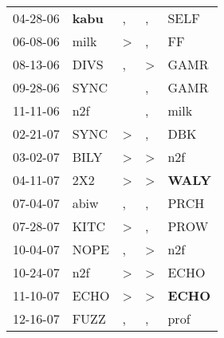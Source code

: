\begin{supertabular}{p{0.07\textwidth}p{0.06\textwidth}p{0.02\textwidth}p{0.02\textwidth}p{0.06\textwidth}}
          04-28-06\textsuperscript{} &  \textbf{kabu\textsuperscript{}} &                , &                , &           SELF\textsuperscript{} \\
          06-08-06\textsuperscript{} &           milk\textsuperscript{} &     \textgreater &                , &             FF\textsuperscript{} \\
          08-13-06\textsuperscript{} &           DIVS\textsuperscript{} &                , &     \textgreater &           GAMR\textsuperscript{} \\
          09-28-06\textsuperscript{} &           SYNC\textsuperscript{} &                  &                , &           GAMR\textsuperscript{} \\
          11-11-06\textsuperscript{} &            n2f\textsuperscript{} &                  &                , &           milk\textsuperscript{} \\
          02-21-07\textsuperscript{} &           SYNC\textsuperscript{} &     \textgreater &                , &            DBK\textsuperscript{} \\
          03-02-07\textsuperscript{} &           BILY\textsuperscript{} &     \textgreater &     \textgreater &            n2f\textsuperscript{} \\
          04-11-07\textsuperscript{} &            2X2\textsuperscript{} &     \textgreater &     \textgreater &  \textbf{WALY\textsuperscript{}} \\
          07-04-07\textsuperscript{} &           abiw\textsuperscript{} &                , &                , &           PRCH\textsuperscript{} \\
          07-28-07\textsuperscript{} &           KITC\textsuperscript{} &     \textgreater &                , &           PROW\textsuperscript{} \\
          10-04-07\textsuperscript{} &           NOPE\textsuperscript{} &                , &     \textgreater &            n2f\textsuperscript{} \\
          10-24-07\textsuperscript{} &            n2f\textsuperscript{} &     \textgreater &     \textgreater &           ECHO\textsuperscript{} \\
          11-10-07\textsuperscript{} &           ECHO\textsuperscript{} &     \textgreater &     \textgreater &  \textbf{ECHO\textsuperscript{}} \\
          12-16-07\textsuperscript{} &           FUZZ\textsuperscript{} &                , &                , &           prof\textsuperscript{} \\

\end{supertabular}
